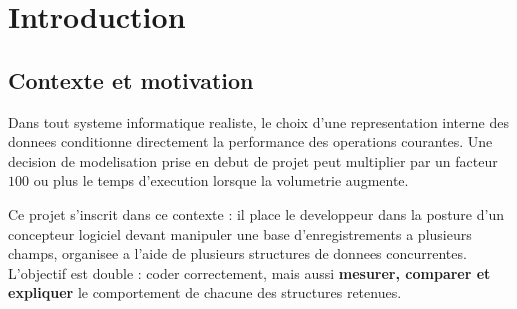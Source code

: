 \documentclass[12pt,a4paper]{article}
\begin{document}
\begin{abstract}
Ce rapport presente la conception, l'implementation et l'evaluation
comparative de trois structures de donnees hybrides appliquees a un
systeme de gestion de scolarite : le tableau statique, le tableau
dynamique de pointeurs avec redimensionnement geometrique, et la liste
chainee avec sentinelle. Chaque structure supporte un ensemble
d'operations : insertion, recherche, suppression, tri (insertion et
rapide), agregations statistiques et persistance binaire. Une analyse
theorique rigoureuse de la complexite asymptotique est confrontee a
une etude experimentale reproductible portant sur des jeux de donnees
allant de $n = 100$ a $n = 100\,000$ enregistrements. L'etude
experimentale se concentre sur trois operations : la recherche, la
suppression et le tri (par insertion et rapide). Les resultats
confirment les predictions theoriques et mettent en evidence les
compromis temps/espace propres a chaque structure.
\end{abstract}

\newpage

\section{Introduction}

\subsection{Contexte et motivation}

Dans tout systeme informatique realiste, le choix d'une representation
interne des donnees conditionne directement la performance des operations
courantes. Une decision de modelisation prise en debut de projet peut
multiplier par un facteur $100$ ou plus le temps d'execution lorsque
la volumetrie augmente.

Ce projet s'inscrit dans ce contexte : il place le developpeur dans
la posture d'un concepteur logiciel devant manipuler une base
d'enregistrements a plusieurs champs, organisee a l'aide de plusieurs
structures de donnees concurrentes. L'objectif est double : coder
correctement, mais aussi \textbf{mesurer, comparer et expliquer}
le comportement de chacune des structures retenues.
\end{document}
